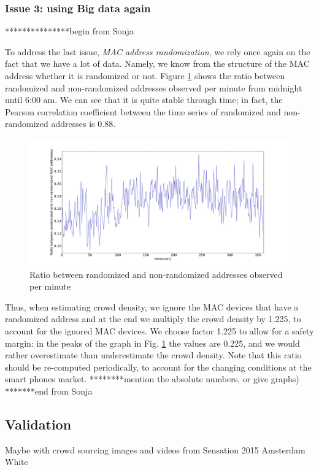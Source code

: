 \documentclass[10pt,a4paper]{article}
\begin{document}
\subsubsection{Issue 3: using Big data again}

***************begin from Sonja

To address the last issue, {\it MAC address randomization}, we rely once again on the fact that we have a lot of data. Namely, we know from the structure of the MAC address whether it is randomized or not. Figure \ref{fig:randomized} shows the ratio between randomized and non-randomized addresses observed per minute from midnight until 6:00 am. We can see that it is quite stable through time; in fact, the Pearson correlation coefficient between the time series of randomized and non-randomized addresses is 0.88. 

\begin{figure}[h!]
	\centering
	\includegraphics[width=130mm]{RatioRandNonrand.jpeg}
	\caption{Ratio between randomized and non-randomized addresses observed per minute}
	\label{fig:randomized}
\end{figure} 

Thus, when estimating crowd density, we ignore the MAC devices that have a randomized address and at the end we multiply the crowd density by 1.225, to account for the ignored MAC devices. We choose factor 1.225 to allow for a safety margin: in the peaks of the graph in Fig. \ref{fig:randomized} the values are 0.225, and we would rather overestimate than underestimate the crowd density. 
Note that this ratio should be re-computed periodically, to account for the changing conditions at the smart phones market.
********mention the absolute numbers, or give graphs)
*******end from Sonja


\subsection{Validation}
Maybe with crowd sourcing images and videos from Sensation 2015 Amsterdam White
\end{document}
